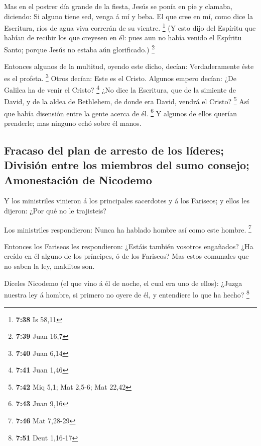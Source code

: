  Mas en el postrer día grande de la fiesta, Jesús se ponía
en pie y clamaba, diciendo: Si alguno tiene sed, venga á mí y beba.
 El que cree en mí, como dice la Escritura, ríos de agua
viva correrán de su vientre. \footnote{\textbf{7:38} Is 58,11}
 (Y esto dijo del Espíritu que habían de recibir los que
creyesen en él: pues aun no había venido el Espíritu Santo; porque Jesús
no estaba aún glorificado.) \footnote{\textbf{7:39} Juan 16,7}

 Entonces algunos de la multitud, oyendo este dicho,
decían: Verdaderamente éste es el profeta. \footnote{\textbf{7:40} Juan
  6,14}  Otros decían: Este es el Cristo. Algunos empero
decían: ¿De Galilea ha de venir el Cristo? \footnote{\textbf{7:41} Juan
  1,46}  ¿No dice la Escritura, que de la simiente de
David, y de la aldea de Bethlehem, de donde era David, vendrá el Cristo?
\footnote{\textbf{7:42} Miq 5,1; Mat 2,5-6; Mat 22,42}  Así
que había disensión entre la gente acerca de él. \footnote{\textbf{7:43}
  Juan 9,16}  Y algunos de ellos querían prenderle; mas
ninguno echó sobre él manos.

\hypertarget{fracaso-del-plan-de-arresto-de-los-luxedderes-divisiuxf3n-entre-los-miembros-del-sumo-consejo-amonestaciuxf3n-de-nicodemo}{%
\subsection{Fracaso del plan de arresto de los líderes; División entre
los miembros del sumo consejo; Amonestación de
Nicodemo}\label{fracaso-del-plan-de-arresto-de-los-luxedderes-divisiuxf3n-entre-los-miembros-del-sumo-consejo-amonestaciuxf3n-de-nicodemo}}

 Y los ministriles vinieron á los principales sacerdotes y
á los Fariseos; y ellos les dijeron: ¿Por qué no le trajisteis?

 Los ministriles respondieron: Nunca ha hablado hombre así
como este hombre. \footnote{\textbf{7:46} Mat 7,28-29}

 Entonces los Fariseos les respondieron: ¿Estáis también
vosotros engañados?  ¿Ha creído en él alguno de los
príncipes, ó de los Fariseos?  Mas estos comunales que no
saben la ley, malditos son.

 Díceles Nicodemo (el que vino á él de noche, el cual era
uno de ellos):  ¿Juzga nuestra ley á hombre, si primero no
oyere de él, y entendiere lo que ha hecho? \footnote{\textbf{7:51} Deut
  1,16-17}

